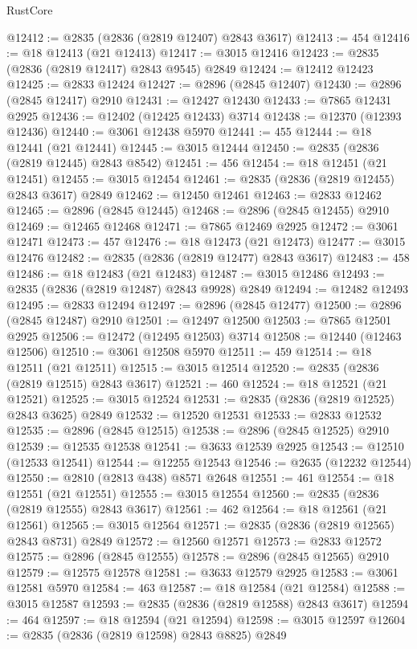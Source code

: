 \begin{lexlean}{RustCore}
\begin{coremodule}
@12412 := @2835 (@2836 (@2819 @12407) @2843 @3617)
@12413 := 454
@12416 := @18 @12413 (@21 @12413)
@12417 := @3015 @12416
@12423 := @2835 (@2836 (@2819 @12417) @2843 @9545) @2849
@12424 := @12412 @12423
@12425 := @2833 @12424
@12427 := @2896 (@2845 @12407)
@12430 := @2896 (@2845 @12417) @2910
@12431 := @12427 @12430
@12433 := @7865 @12431 @2925
@12436 := @12402 (@12425 @12433) @3714
@12438 := @12370 (@12393 @12436)
@12440 := @3061 @12438 @5970
@12441 := 455
@12444 := @18 @12441 (@21 @12441)
@12445 := @3015 @12444
@12450 := @2835 (@2836 (@2819 @12445) @2843 @8542)
@12451 := 456
@12454 := @18 @12451 (@21 @12451)
@12455 := @3015 @12454
@12461 := @2835 (@2836 (@2819 @12455) @2843 @3617) @2849
@12462 := @12450 @12461
@12463 := @2833 @12462
@12465 := @2896 (@2845 @12445)
@12468 := @2896 (@2845 @12455) @2910
@12469 := @12465 @12468
@12471 := @7865 @12469 @2925
@12472 := @3061 @12471
@12473 := 457
@12476 := @18 @12473 (@21 @12473)
@12477 := @3015 @12476
@12482 := @2835 (@2836 (@2819 @12477) @2843 @3617)
@12483 := 458
@12486 := @18 @12483 (@21 @12483)
@12487 := @3015 @12486
@12493 := @2835 (@2836 (@2819 @12487) @2843 @9928) @2849
@12494 := @12482 @12493
@12495 := @2833 @12494
@12497 := @2896 (@2845 @12477)
@12500 := @2896 (@2845 @12487) @2910
@12501 := @12497 @12500
@12503 := @7865 @12501 @2925
@12506 := @12472 (@12495 @12503) @3714
@12508 := @12440 (@12463 @12506)
@12510 := @3061 @12508 @5970
@12511 := 459
@12514 := @18 @12511 (@21 @12511)
@12515 := @3015 @12514
@12520 := @2835 (@2836 (@2819 @12515) @2843 @3617)
@12521 := 460
@12524 := @18 @12521 (@21 @12521)
@12525 := @3015 @12524
@12531 := @2835 (@2836 (@2819 @12525) @2843 @3625) @2849
@12532 := @12520 @12531
@12533 := @2833 @12532
@12535 := @2896 (@2845 @12515)
@12538 := @2896 (@2845 @12525) @2910
@12539 := @12535 @12538
@12541 := @3633 @12539 @2925
@12543 := @12510 (@12533 @12541)
@12544 := @12255 @12543
@12546 := @2635 (@12232 @12544)
@12550 := @2810 (@2813 @438) @8571 @2648
@12551 := 461
@12554 := @18 @12551 (@21 @12551)
@12555 := @3015 @12554
@12560 := @2835 (@2836 (@2819 @12555) @2843 @3617)
@12561 := 462
@12564 := @18 @12561 (@21 @12561)
@12565 := @3015 @12564
@12571 := @2835 (@2836 (@2819 @12565) @2843 @8731) @2849
@12572 := @12560 @12571
@12573 := @2833 @12572
@12575 := @2896 (@2845 @12555)
@12578 := @2896 (@2845 @12565) @2910
@12579 := @12575 @12578
@12581 := @3633 @12579 @2925
@12583 := @3061 @12581 @5970
@12584 := 463
@12587 := @18 @12584 (@21 @12584)
@12588 := @3015 @12587
@12593 := @2835 (@2836 (@2819 @12588) @2843 @3617)
@12594 := 464
@12597 := @18 @12594 (@21 @12594)
@12598 := @3015 @12597
@12604 := @2835 (@2836 (@2819 @12598) @2843 @8825) @2849

\end{coremodule}
\end{lexlean}
